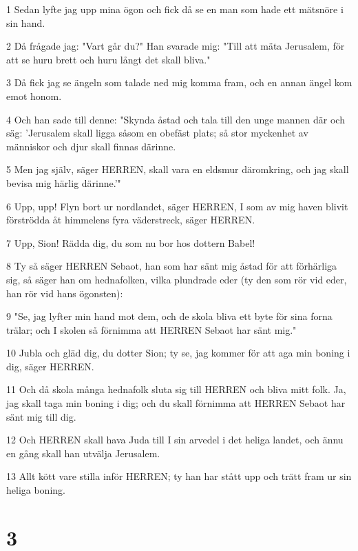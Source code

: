 \par 1 Sedan lyfte jag upp mina ögon och fick då se en man som hade ett mätsnöre i sin hand.
\par 2 Då frågade jag: "Vart går du?" Han svarade mig: "Till att mäta Jerusalem, för att se huru brett och huru långt det skall bliva."
\par 3 Då fick jag se ängeln som talade ned mig komma fram, och en annan ängel kom emot honom.
\par 4 Och han sade till denne: "Skynda åstad och tala till den unge mannen där och säg: 'Jerusalem skall ligga såsom en obefäst plats; så stor myckenhet av människor och djur skall finnas därinne.
\par 5 Men jag själv, säger HERREN, skall vara en eldsmur däromkring, och jag skall bevisa mig härlig därinne.'"
\par 6 Upp, upp! Flyn bort ur nordlandet, säger HERREN, I som av mig haven blivit förströdda åt himmelens fyra väderstreck, säger HERREN.
\par 7 Upp, Sion! Rädda dig, du som nu bor hos dottern Babel!
\par 8 Ty så säger HERREN Sebaot, han som har sänt mig åstad för att förhärliga sig, så säger han om hednafolken, vilka plundrade eder (ty den som rör vid eder, han rör vid hans ögonsten):
\par 9 "Se, jag lyfter min hand mot dem, och de skola bliva ett byte för sina forna trälar; och I skolen så förnimma att HERREN Sebaot har sänt mig."
\par 10 Jubla och gläd dig, du dotter Sion; ty se, jag kommer för att aga min boning i dig, säger HERREN.
\par 11 Och då skola många hednafolk sluta sig till HERREN och bliva mitt folk. Ja, jag skall taga min boning i dig; och du skall förnimma att HERREN Sebaot har sänt mig till dig.
\par 12 Och HERREN skall hava Juda till I sin arvedel i det heliga landet, och ännu en gång skall han utvälja Jerusalem.
\par 13 Allt kött vare stilla inför HERREN; ty han har stått upp och trätt fram ur sin heliga boning.

\chapter{3}

